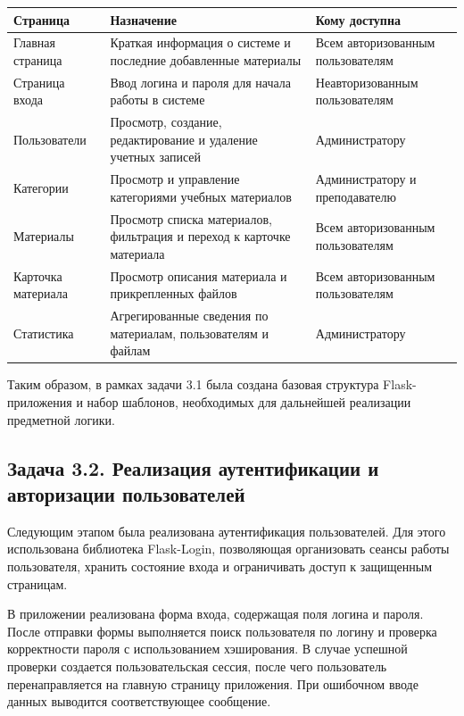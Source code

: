 \documentclass[14pt,a4paper]{extarticle}
\begin{document}
\begin{center}
\small\begin{tabularx}{0.96\textwidth}{>{\raggedright\arraybackslash}p{3.8cm} >{\raggedright\arraybackslash}X >{\raggedright\arraybackslash}p{4.3cm}}
\toprule
\textbf{Страница} & \textbf{Назначение} & \textbf{Кому доступна} \\
\midrule
Главная страница & Краткая информация о системе и последние добавленные материалы & Всем авторизованным пользователям \\
Страница входа & Ввод логина и пароля для начала работы в системе & Неавторизованным пользователям \\
Пользователи & Просмотр, создание, редактирование и удаление учетных записей & Администратору \\
Категории & Просмотр и управление категориями учебных материалов & Администратору и преподавателю \\
Материалы & Просмотр списка материалов, фильтрация и переход к карточке материала & Всем авторизованным пользователям \\
Карточка материала & Просмотр описания материала и прикрепленных файлов & Всем авторизованным пользователям \\
Статистика & Агрегированные сведения по материалам, пользователям и файлам & Администратору \\
\bottomrule
\end{tabularx}
\end{center}

Таким образом, в рамках задачи 3.1 была создана базовая структура Flask-приложения и набор шаблонов, необходимых для дальнейшей реализации предметной логики.

\subsection{Задача 3.2. Реализация аутентификации и авторизации пользователей}

Следующим этапом была реализована аутентификация пользователей. Для этого использована библиотека Flask-Login, позволяющая организовать сеансы работы пользователя, хранить состояние входа и ограничивать доступ к защищенным страницам.

В приложении реализована форма входа, содержащая поля логина и пароля. После отправки формы выполняется поиск пользователя по логину и проверка корректности пароля с использованием хэширования. В случае успешной проверки создается пользовательская сессия, после чего пользователь перенаправляется на главную страницу приложения. При ошибочном вводе данных выводится соответствующее сообщение.
\end{document}
